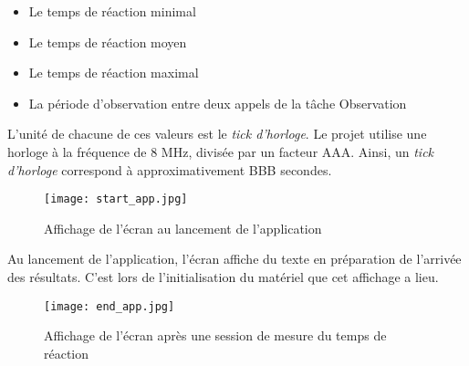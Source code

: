 \begin{itemize}
    \item Le temps de réaction minimal
    \item Le temps de réaction moyen
    \item Le temps de réaction maximal
    \item La période d'observation entre deux appels de la tâche Observation
\end{itemize}

L'unité de chacune de ces valeurs est le \textit{tick d'horloge}.
Le projet utilise une horloge à la fréquence de 8 MHz, divisée par un facteur AAA.
Ainsi, un \textit{tick d'horloge} correspond à approximativement BBB secondes.

\begin{figure}[h]
    \centering
    \texttt{[image: start\_app.jpg]}
    \caption{Affichage de l'écran au lancement de l'application}
    \label{fig:start_app}
\end{figure}

Au lancement de l'application, l'écran affiche du texte en préparation de l'arrivée des résultats.
C'est lors de l'initialisation du matériel que cet affichage a lieu.

\begin{figure}[h]
    \centering
    \texttt{[image: end\_app.jpg]}
    \caption{Affichage de l'écran après une session de mesure du temps de réaction}
    \label{fig:end_app}
\end{figure}

